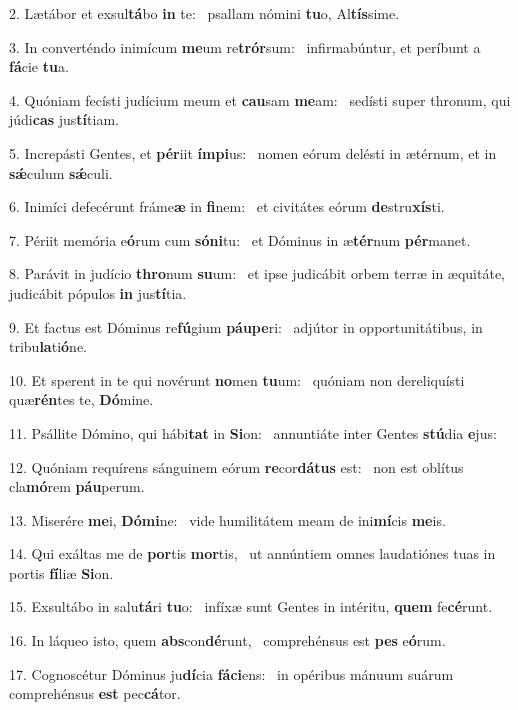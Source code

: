 2. Lætábor et exsul\textbf{tá}bo \textbf{in} te: \ast\  psallam nómini \textbf{tu}o, Al\textbf{tís}sime.\

3. In converténdo inimícum \textbf{me}um re\textbf{trór}sum: \ast\  infirmabúntur, et períbunt a \textbf{fá}cie \textbf{tu}a.\

4. Quóniam fecísti judícium meum et \textbf{cau}sam \textbf{me}am: \ast\  sedísti super thronum, qui júdi\textbf{cas} jus\textbf{tí}tiam.\

5. Increpásti Gentes, et \textbf{pér}iit \textbf{ím}\textbf{pi}us: \ast\  nomen eórum delésti in ætérnum, et in \textbf{sǽ}culum \textbf{sǽ}culi.\

6. Inimíci defecérunt fráme\textbf{æ} in \textbf{fi}nem: \ast\  et civitátes eórum \textbf{de}stru\textbf{xís}ti.\

7. Périit memória e\textbf{ó}rum cum \textbf{só}\textbf{ni}tu: \ast\  et Dóminus in æ\textbf{tér}num \textbf{pér}manet.\

8. Parávit in judício \textbf{thro}num \textbf{su}um: \ast\  et ipse judicábit orbem terræ in æquitáte, judicábit pópulos \textbf{in} jus\textbf{tí}tia.\

9. Et factus est Dóminus re\textbf{fú}gium \textbf{páu}\textbf{pe}ri: \ast\  adjútor in opportunitátibus, in tribu\textbf{la}ti\textbf{ó}ne.\

10. Et sperent in te qui novérunt \textbf{no}men \textbf{tu}um: \ast\  quóniam non dereliquísti quæ\textbf{rén}tes te, \textbf{Dó}mine.\

11. Psállite Dómino, qui hábi\textbf{tat} in \textbf{Si}on: \ast\  annuntiáte inter Gentes \textbf{stú}dia \textbf{e}jus:\

12. Quóniam requírens sánguinem eórum \textbf{re}cor\textbf{dá}\textbf{tus} est: \ast\  non est oblítus cla\textbf{mó}rem \textbf{páu}perum.\

13. Miserére \textbf{me}i, \textbf{Dó}\textbf{mi}ne: \ast\  vide humilitátem meam de ini\textbf{mí}cis \textbf{me}is.\

14. Qui exáltas me de \textbf{por}tis \textbf{mor}tis, \ast\  ut annúntiem omnes laudatiónes tuas in portis \textbf{fí}liæ \textbf{Si}on.\

15. Exsultábo in salu\textbf{tá}ri \textbf{tu}o: \ast\  infíxæ sunt Gentes in intéritu, \textbf{quem} fe\textbf{cé}runt.\

16. In láqueo isto, quem \textbf{abs}con\textbf{dé}runt, \ast\  comprehénsus est \textbf{pes} e\textbf{ó}rum.\

17. Cognoscétur Dóminus ju\textbf{dí}cia \textbf{fá}\textbf{ci}ens: \ast\  in opéribus mánuum suárum comprehénsus \textbf{est} pec\textbf{cá}tor.\

